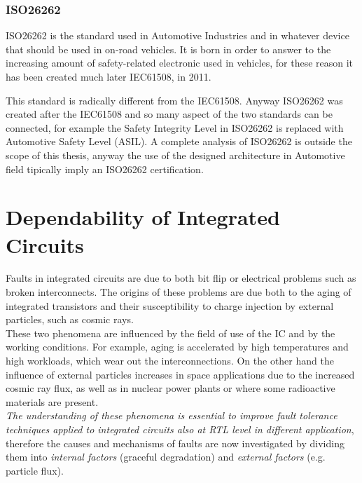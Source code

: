 {{{{		        
		    }
		    
		    \subsubsection{ISO26262}{
		            ISO26262 is the standard used in Automotive Industries and in whatever device that should be used in on-road vehicles. It is born in order to answer to the increasing amount of safety-related electronic used in vehicles, for these reason it has been created much later IEC61508, in 2011.
		            
		            This standard is radically different from the IEC61508. Anyway ISO26262 was created after the IEC61508 and so many aspect of the two standards can be connected, for example the Safety Integrity Level in ISO26262 is replaced with Automotive Safety Level (ASIL). A complete analysis of ISO26262 is outside the scope of this thesis, anyway the use of the designed architecture in Automotive field tipically imply an ISO26262 certification.
		    }
		    
		} %
	}%
	\newpage
	\section{Dependability of Integrated Circuits}{
		Faults in integrated circuits are due to both bit flip or electrical problems such as broken interconnects. The origins of these problems are due both to the aging of integrated transistors and their susceptibility to charge injection by external particles, such as cosmic rays.\\
		
		
		These two phenomena are influenced by the field of use of the IC and by the working conditions. For example, aging is accelerated by high temperatures and high workloads, which wear out the interconnections. On the other hand the influence of external particles increases in space applications due to the increased cosmic ray flux, as well as in nuclear power plants or where some radioactive materials are present.\\
		
		
		\textit{The understanding of these phenomena is essential to improve fault tolerance techniques applied to integrated circuits also at RTL level in different application}, therefore the causes and mechanisms of faults are now investigated by dividing them into \textit{internal factors} (graceful degradation) and \textit{external factors} (e.g. particle flux).
		
}}

